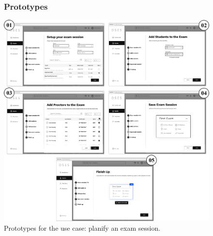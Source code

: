 \documentclass[]{uc2pfecaneva}
\begin{document}
    \begin{figure}
        \subsubsection{Prototypes}
        \includegraphics[width=\textwidth]{images/prototypes_create_exam_session}

        \caption{Prototypes for the use case: planify an exam session.}
    \end{figure}
    \clearpage
\end{document}
